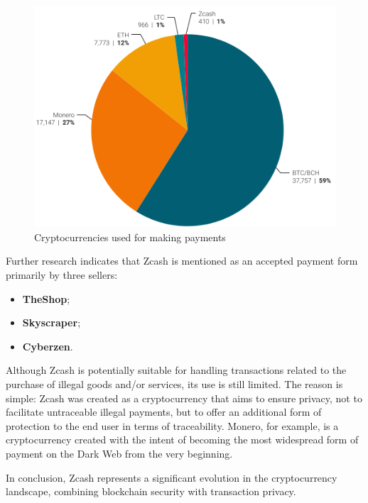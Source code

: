 \begin{figure}[!ht]
    \centering
    \includegraphics[width=1\linewidth]{img/cryptoPayments.png}
    \caption{Cryptocurrencies used for making payments}
    \label{fig:cryptoPayments}
\end{figure}

\noindent Further research indicates that Zcash is mentioned as an accepted payment form primarily by three sellers:
\begin{itemize}
    \item \textbf{TheShop};
    \item \textbf{Skyscraper};
    \item \textbf{Cyberzen}.
\end{itemize}

\noindent Although Zcash is potentially suitable for handling transactions related to the purchase of illegal goods and/or services, its use is still limited. The reason is simple: Zcash was created as a cryptocurrency that aims to ensure privacy, not to facilitate untraceable illegal payments, but to offer an additional form of protection to the end user in terms of traceability. Monero, for example, is a cryptocurrency created with the intent of becoming the most widespread form of payment on the Dark Web from the very beginning.

\noindent In conclusion, Zcash represents a significant evolution in the cryptocurrency landscape, combining blockchain security with transaction privacy.